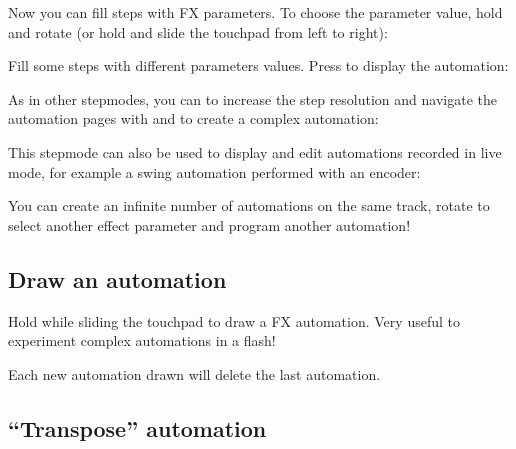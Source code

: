 Now you can fill steps with FX parameters. To choose the parameter value, hold  and rotate \encodericon{} (or hold  and slide the touchpad from left to right):



Fill some steps with different parameters values. Press  to display the automation:




As in other stepmodes, you can  to increase the step resolution and navigate the automation pages with \btn{<} and \btn{>} to create a complex automation:



This stepmode can also be used to display and edit automations recorded in live mode, for example a swing automation performed with an encoder:


You can create an infinite number of automations on the same track, rotate \encodericon{} to select another effect parameter and program another automation!

\subsection{Draw an automation}

Hold  while sliding the touchpad to draw a FX automation. Very useful to experiment complex automations in a flash!

Each new automation drawn will delete the last automation.

\subsection{``Transpose'' automation}

